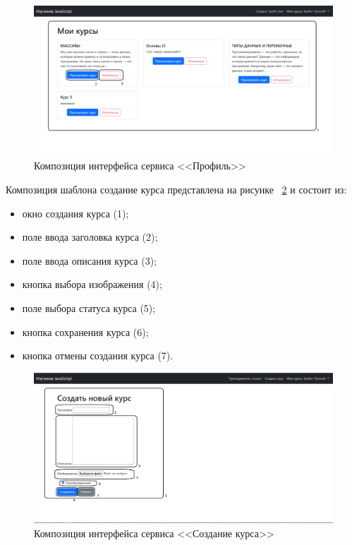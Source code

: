 \begin{figure}[h]
	\centering
	\includegraphics[width=1\linewidth]{images/профиль}
	\caption{Композиция интерфейса сервиса <<Профиль>>}
	\label{templ:image8}
\end{figure}


Композиция шаблона создание курса представлена на рисунке ~\ref{templ:image9} и состоит из:

\begin{itemize}
	\item окно создания курса (1);
	\item поле ввода заголовка курса (2);
	\item поле ввода описания курса (3);
	\item кнопка выбора изображения (4);
	\item поле выбора статуса курса (5);
	\item кнопка сохранения курса (6);
	\item кнопка отмены создания курса (7).
\end{itemize}

\begin{figure}[h]
	\centering
	\includegraphics[width=0.9\linewidth]{images/создатькурс}
	\caption{Композиция интерфейса сервиса <<Создание курса>>}
	\label{templ:image9}
\end{figure}

